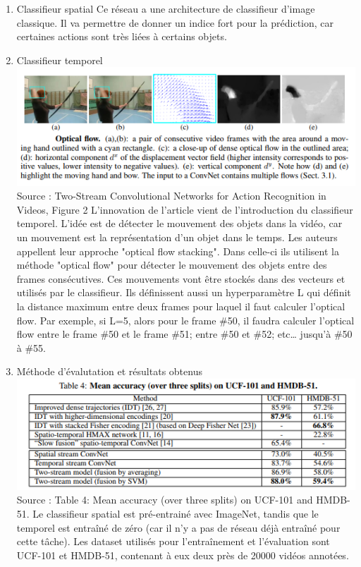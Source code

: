 \documentclass[11pt]{article}
\begin{document}
\begin{enumerate}
\item Classifieur spatial
\label{sec-8-1-1-1}
Ce réseau a une architecture de classifieur d'image classique. Il va permettre
de donner un indice fort pour la prédiction, car certaines actions sont très 
liées à certains objets.

\item Classifieur temporel
\label{sec-8-1-1-2}
\includegraphics[width=.9\linewidth]{optical_flow.png}
Source : Two-Stream Convolutional Networks for Action Recognition in Videos, Figure 2
L'innovation de l'article vient de l'introduction du classifieur temporel.
L'idée est de détecter le mouvement des objets dans la vidéo, car un mouvement
est la représentation d'un objet dans le temps.
Les auteurs appellent leur approche "optical flow stacking".
Dans celle-ci ils utilisent la méthode "optical flow" pour détecter
le mouvement des objets entre des frames consécutives. 
Ces mouvements vont être stockés dans des vecteurs et utilisés par le classifieur.
Ils définissent aussi un hyperparamètre L qui définit la distance maximum entre deux frames
pour laquel il faut calculer l'optical flow. Par exemple, si L=5, alors pour le 
frame \#50, il faudra calculer l'optical flow entre le frame \#50 et le frame \#51; entre
\#50 et \#52; etc\ldots{} jusqu'à \#50 à \#55.

\item Méthode d'évalutation et résultats obtenus
\label{sec-8-1-1-3}
\includegraphics[width=.9\linewidth]{two_stream_res.png}
Source : Table 4: Mean accuracy (over three splits) on UCF-101 and HMDB-51.
 
Le classifieur spatial est pré-entrainé avec ImageNet, tandis que le temporel
est entraîné de zéro (car il n'y a pas de réseau déjà entraîné pour cette tâche).
Les dataset utilisés pour l'entraînement et l'évaluation sont UCF-101 et HMDB-51,
contenant à eux deux près de 20000 vidéos annotées.


\end{enumerate}
\end{document}
